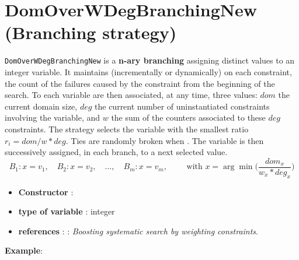 \section{DomOverWDegBranchingNew (Branching strategy)}\label{domoverwdeg:domoverwdegbranchstrat}\hypertarget{domoverwdeg:domoverwdegbranchstrat}{}
\begin{notedef}
  \texttt{DomOverWDegBranchingNew} is a \textbf{n-ary branching} assigning distinct values to an integer variable. It maintains (incrementally or dynamically) on each constraint, the count of the failures caused by the constraint from the beginning of the search.
To each variable are then associated, at any time, three values: $dom$ the current domain size, $deg$ the current number of uninstantiated constraints involving the variable, and $w$ the sum of the counters associated to these $deg$ constraints.
The strategy selects the variable with the smallest ratio $r_i=dom/w*deg$.  Ties are randomly broken when .
The variable is then successively assigned, in each branch, to a next selected value.
$$B_1: x=v_1,\quad B_2: x= v_2,\quad\ldots,\quad B_m: x= v_m,\qquad\text{ with } x=\arg\min\bigl(\frac{dom_x}{w_x*deg_x}\bigr)$$
\end{notedef}

\begin{itemize}
	\item \textbf{Constructor} :
	\item \textbf{type of variable} : integer
	\item \textbf{references} : \cite{Boussemart04}: \emph{Boosting systematic search by weighting constraints}.
\end{itemize}

\textbf{Example}:
%

